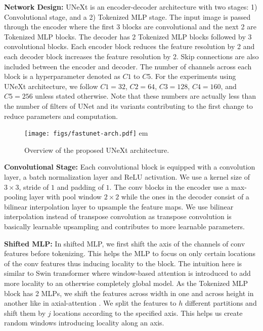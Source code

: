 \documentclass[runningheads]{llncs}
\begin{document}
\noindent \textbf{Network Design:} UNeXt is an encoder-decoder architecture with two stages: 1) Convolutional stage, and a 2) Tokenized MLP stage. The input image is passed through the encoder where the first 3 blocks are convolutional and the next 2 are Tokenized MLP blocks. The decoder has 2 Tokenized MLP blocks followed by 3 convolutional blocks. Each encoder block reduces the feature resolution by 2 and each decoder block increases the feature resolution by 2. Skip connections are also included between the encoder and decoder. The number of channels across each block is a hyperparameter denoted as $C1$ to $C5$. For the experiments using UNeXt architecture, we follow $C1=32$, $C2=64$, $C3=128$, $C4=160$, and $C5=256$ unless stated otherwise. Note that these numbers are actually less than the number of filters of UNet and its variants contributing to the first change to reduce parameters and computation.



\begin{figure*}[]
	\centering
	\texttt{[image: figs/fastunet-arch.pdf]}
 em
	\caption{Overview of the proposed UNeXt architecture.}    
	\label{arch}

\end{figure*}
\noindent \textbf{Convolutional Stage:} Each convolutional block is equipped with a convolution layer, a batch normalization layer and ReLU activation. We use a kernel size of $3 \times 3$, stride of $1$ and padding of $1$. The conv blocks in the encoder use a max-pooling layer with pool window $2 \times 2$ while the ones in the decoder consist of a bilinear interpolation layer to upsample the feature maps. We use bilinear interpolation instead of transpose convolution as transpose convolution is basically learnable upsampling and contributes to more learnable parameters. 


\noindent \textbf{Shifted MLP:} In shifted MLP, we first shift the axis of the channels of conv features before tokenizing. This helps the MLP to focus on only certain locations of the conv features thus inducing locality to the block. The intuition here is similar to Swin transformer \cite{cao2021swin} where window-based attention is introduced to add more locality to an otherwise completely global model. As the Tokenized MLP block has 2 MLPs, we shift the features across width in one and across height in another like in axial-attention \cite{wang2020axial}. We split the features to $h$ different partitions and shift them by $j$ locations according to the specified axis. This helps us create random windows introducing locality along an axis.
\end{document}
